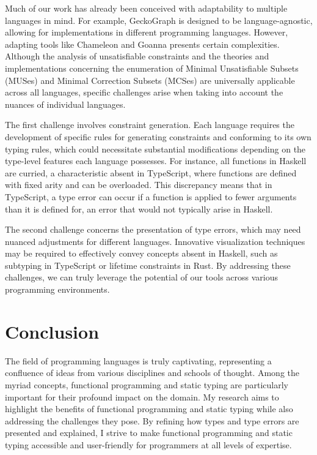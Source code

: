 Much of our work has already been conceived with adaptability to multiple languages in mind. For example, GeckoGraph is designed to be language-agnostic, allowing for implementations in different programming languages. However, adapting tools like Chameleon and Goanna presents certain complexities. Although the analysis of unsatisfiable constraints and the theories and implementations concerning the enumeration of Minimal Unsatisfiable Subsets (MUSes) and Minimal Correction Subsets (MCSes) are universally applicable across all languages, specific challenges arise when taking into account the nuances of individual languages.

The first challenge involves constraint generation. Each language requires the development of specific rules for generating constraints and conforming to its own typing rules, which could necessitate substantial modifications depending on the type-level features each language possesses. For instance, all functions in Haskell are curried, a characteristic absent in TypeScript, where functions are defined with fixed arity and can be overloaded. This discrepancy means that in TypeScript, a type error can occur if a function is applied to fewer arguments than it is defined for, an error that would not typically arise in Haskell.

The second challenge concerns the presentation of type errors, which may need nuanced adjustments for different languages. Innovative visualization techniques may be required to effectively convey concepts absent in Haskell, such as subtyping in TypeScript or lifetime constraints in Rust. By addressing these challenges, we can truly leverage the potential of our tools across various programming environments.


\section{Conclusion}


The field of programming languages is truly captivating, representing a confluence of ideas from various disciplines and schools of thought. Among the myriad concepts, functional programming and static typing are particularly important for their profound impact on the domain. My research aims to highlight the benefits of functional programming and static typing while also addressing the challenges they pose. By refining how types and type errors are presented and explained, I strive to make functional programming and static typing accessible and user-friendly for programmers at all levels of expertise.


